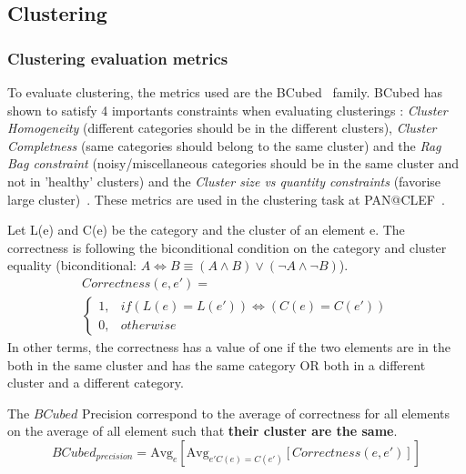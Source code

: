\subsection{Clustering}

\subsubsection{Clustering evaluation metrics}

To evaluate clustering, the metrics used are the BCubed~\cite{bcubed} family.
BCubed has shown to satisfy 4 importants constraints when evaluating clusterings : \textit{Cluster Homogeneity} (different categories should be in the different clusters), \textit{Cluster Completness} (same categories should belong to the same cluster) and the \textit{Rag Bag constraint} (noisy/miscellaneous categories should be in the same cluster and not in 'healthy' clusters) and the \textit{Cluster size vs quantity constraints} (favorise large cluster)~\cite{bcubed}.
These metrics are used in the clustering task at PAN@CLEF~\cite{pan16}.

\begin{definition}
  Let L(e) and C(e) be the category and the cluster of an element e.
  The correctness is following the biconditional condition on the category and cluster equality (biconditional: $A \Longleftrightarrow B \equiv (A \land B) \lor (\neg A \land \neg B)$).
  \begin{gather*}
    Correctness(e, e') = \\
    \begin{cases}
      1, & if (L(e) = L(e')) \Longleftrightarrow (C(e) = C(e'))\\
      0, & otherwise
    \end{cases}
  \end{gather*}
  In other terms, the correctness has a value of one if the two elements are in the both in the same cluster and has the same category OR both in a different cluster and a different category.
\end{definition}

\begin{definition}
  The $BCubed$ Precision correspond to the average of correctness for all elements on the average of all element such that \textbf{their cluster are the same}.
  \begin{equation}
    BCubed_{precision} = \text{Avg}_{e}[\text{Avg}_{e' C(e)=C(e')}[Correctness(e, e')]]
  \end{equation}
\end{definition}


